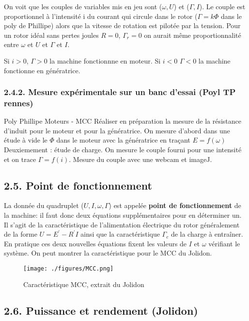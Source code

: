 \documentclass[french, a4paper, 10pt, twocolumn, landscape]{article}
\begin{document}
On voit que les couples de variables mis en jeu sont ($\omega, U$) et ($\Gamma, I$). Le couple est proportionnel à l’intensité i du courant qui circule dans le rotor ($\Gamma = k\Phi$ dans le poly de Phillipe) alors que la vitesse de rotation est pilotée par la tension. Pour un rotor idéal sans pertes joules $R=0$, $\Gamma_r=0$ on aurait même proportionnalité entre $\omega$ et $U$ et $\Gamma$ et $I$.\medskip


Si $i>0$, $\Gamma>0$ la machine fonctionnne en moteur. Si $i<0$ $\Gamma<0$ la machine fonctionne en génératrice.

\subsubsection*{2.4.2. Mesure expérimentale sur un banc d'essai (Poyl TP rennes)}
Poly Phillipe Moteurs - MCC
Réaliser en préparation la mesure de la résistance d'induit pour le moteur et pour la génératrice. On mesure d'abord dans une étude à vide le $\Phi$ dans le moteur avec la génératrice en traçant $E=f(\omega)$
Deuxiemement : étude de charge. On mesure le couple fourni pour une intensité et on trace $\Gamma=f(i)$. Mesure du couple avec une webcam et imageJ. 


\subsection*{2.5. Point de fonctionnement}

La donnée du quadruplet ($U,I, \omega, \Gamma$) est appelée \textbf{point de fonctionnement}  de la machine: il faut donc deux équations supplémentaires pour en déterminer un. Il s'agit de la caractéristique de l'alimentation électrique du rotor généralement de la forme $U = E^\prime-R^\prime I$ ainsi que la caractéristique $\Gamma_c$ de la charge à entraîner. En pratique ces deux nouvelles équations fixent les valeurs de $I$ et $\omega$ vérifiant le système. On peut montrer la caractéristique pour le MCC du Jolidon.

\begin{figure}[ht]
	\centering
  \texttt{[image: ./figures/MCC.png]}
	\caption{Caractéristique MCC, extrait du Jolidon}
\end{figure}


\subsection*{2.6. Puissance et rendement (Jolidon)}
\end{document}
